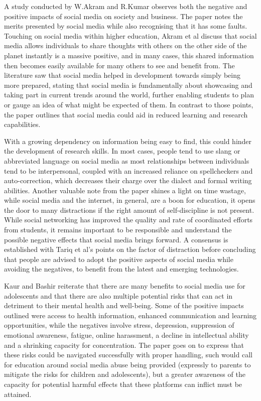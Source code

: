 \documentclass[lettersize,journal]{IEEEtran}
\begin{document}
    A study conducted by W.Akram and R.Kumar \cite{Akram et al 2017} observes both the negative
    and positive impacts of social media on society and business.  The paper notes the merits presented by social media
    while also recognising that it has some faults. Touching on social media within higher education, Akram et al
    discuss that social media allows individuals to share thoughts with others on the other side of the planet instantly
    is a massive positive, and in many cases, this shared information then becomes easily available for many others to
    see and benefit from. The literature saw that social media helped in development towards simply being more prepared, stating that
    social media is fundamentally about showcasing and taking part in  current trends around the world, further enabling students
    to plan or gauge an idea of what might be expected of them. In contrast to those points, the paper outlines that
    social media could aid in reduced learning and research capabilities.


    With a growing dependency on information being easy to find, this could hinder the development of research skills.
    In most cases, people tend to use slang or abbreviated language on social media as most relationships between individuals tend to be interpersonal, coupled
    with an increased reliance on spellcheckers and auto-correction, which decreases their charge over the dialect and
    formal writing abilities. Another valuable note from the paper shines a light on time wastage, while social media
    and the internet, in general, are a boon for education, it opens the door to many distractions if the right amount
   of self-discipline is not present. While social networking has improved the quality and rate of coordinated
    efforts from students, it remains important to be responsible and understand the possible negative effects
    that social media brings forward. A consensus is established with Tariq et al's \cite{Tariq et al 2012}
    points on the factor of distraction before concluding that people are advised to adopt the positive aspects of
    social media while avoiding the negatives, to benefit from the latest and emerging technologies.

    Kaur and Bashir \cite{Bashir et al 2015} reiterate that there are many benefits to social media use
    for adolescents and that there are also multiple potential risks that can act in detriment to their
    mental health and well-being. Some of the positive impacts outlined were access to health information,
    enhanced communication and learning opportunities, while the negatives involve stress, depression,
    suppression of emotional awareness, fatigue, online harassment, a decline in intellectual ability
    and a shrinking capacity for concentration. The paper goes on to express that these risks could be
    navigated successfully with proper handling, such would call for education around social media abuse
    being provided (expressly to parents to mitigate the risks for children and adolescents), but a greater
    awareness of the capacity for potential harmful effects that these platforms can inflict must be attained.
\end{document}
